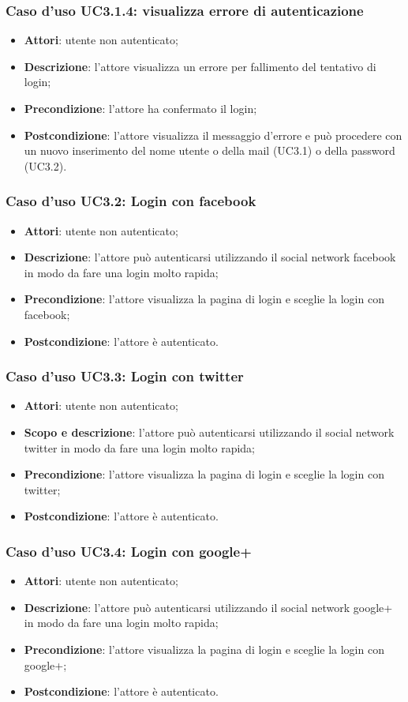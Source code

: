 \subsubsection{Caso d'uso UC3.1.4: visualizza errore di autenticazione}
\begin{itemize}
	\item \textbf{Attori}: utente non autenticato;
	\item \textbf{Descrizione}: l'attore visualizza un errore per fallimento del tentativo di login;
	\item \textbf{Precondizione}: l'attore ha confermato il login;
	\item \textbf{Postcondizione}: l'attore visualizza il messaggio d'errore e può procedere con un nuovo inserimento del nome utente o della mail (UC3.1) o della password (UC3.2).
\end{itemize}
\subsubsection{Caso d'uso UC3.2: Login con facebook}
\begin{itemize}
	\item \textbf{Attori}: utente non autenticato;
	\item \textbf{Descrizione}: l'attore può autenticarsi utilizzando il social network facebook in modo da fare una login molto rapida;
	\item \textbf{Precondizione}: l'attore visualizza la pagina di login e sceglie la login con facebook;
	\item \textbf{Postcondizione}: l'attore è autenticato.
\end{itemize}
\subsubsection{Caso d'uso UC3.3: Login con twitter}
\begin{itemize}
	\item \textbf{Attori}: utente non autenticato;
	\item \textbf{Scopo e descrizione}: l'attore può autenticarsi utilizzando il social network twitter in modo da fare una login molto rapida;
	\item \textbf{Precondizione}: l'attore visualizza la pagina di login e sceglie la login con twitter;
	\item \textbf{Postcondizione}: l'attore è autenticato.
\end{itemize}
\subsubsection{Caso d'uso UC3.4: Login con google+}
\begin{itemize}
	\item \textbf{Attori}: utente non autenticato;
	\item \textbf{Descrizione}: l'attore può autenticarsi utilizzando il social network google+ in modo da fare una login molto rapida;
	\item \textbf{Precondizione}: l'attore visualizza la pagina di login e sceglie la login con google+;
	\item \textbf{Postcondizione}: l'attore è autenticato.
\end{itemize}
